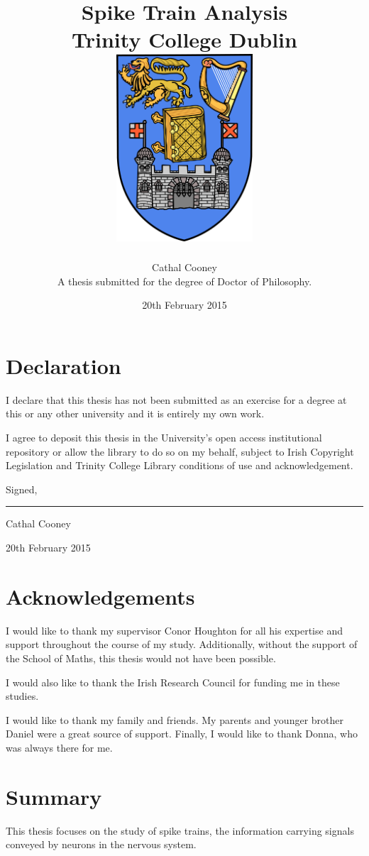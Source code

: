 \documentclass[12pt]{report}
\title{
	{Spike Train Analysis} \\
	{\large Trinity College Dublin} \bigskip\\
	{\includegraphics[width=2in]{tcd.png}}
}
\author{Cathal Cooney\\ \bigskip A thesis submitted for the degree of Doctor of Philosophy.}
\date{20th February 2015}
\begin{document}
\maketitle

%
%
\chapter*{Declaration}
I declare that this thesis has not been submitted as an exercise for a degree at this or any other university and it is entirely my own work.

\bigskip
I agree to deposit this thesis in the University's open access institutional repository or allow the library to do so on my behalf, subject to Irish Copyright Legislation and Trinity College Library conditions of use and acknowledgement.

\bigskip

\bigskip

\bigskip

Signed,

\bigskip

\bigskip

\rule{20em}{0.5pt}

Cathal Cooney

20th February 2015

\chapter*{Acknowledgements}
I would like to thank my supervisor Conor Houghton for all his expertise and support throughout the course of my study.  Additionally, without the support of the School of Maths, this thesis would not have been possible.

I would also like to thank the Irish Research Council for funding me in these studies.

I would like to thank my family and friends.  My parents and younger brother Daniel were a great source of support.  Finally, I would like to thank Donna, who was always there for me.

\chapter*{Summary}
This thesis focuses on the study of spike trains, the information carrying signals conveyed by neurons in the nervous system.
\end{document}
